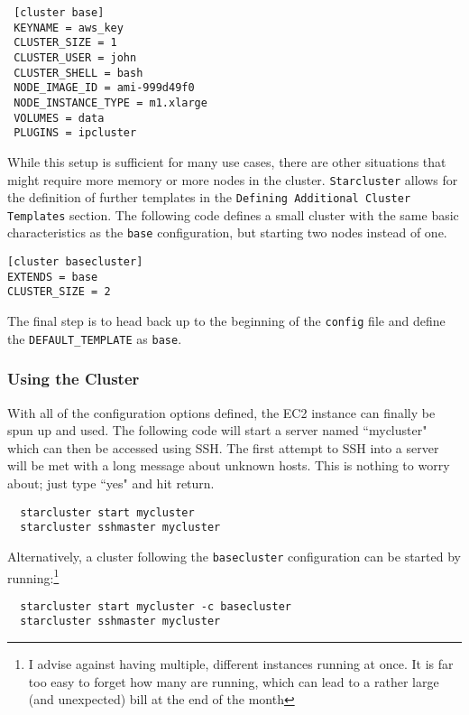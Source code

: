 \documentclass[12pt, letterpaper]{article}
\begin{document}
\begin{verbatim}
 [cluster base]
 KEYNAME = aws_key
 CLUSTER_SIZE = 1
 CLUSTER_USER = john 
 CLUSTER_SHELL = bash
 NODE_IMAGE_ID = ami-999d49f0   
 NODE_INSTANCE_TYPE = m1.xlarge
 VOLUMES = data
 PLUGINS = ipcluster
\end{verbatim}

While this setup is sufficient for many use cases, there are other situations that 
might require more memory or more nodes in the cluster. \texttt{Starcluster} allows for 
the definition of further templates in the \texttt{Defining Additional Cluster Templates}
section. The following code defines a small cluster with the same basic characteristics as the \texttt{base}
configuration, but starting two nodes instead of one. 

\begin{verbatim}
[cluster basecluster]
EXTENDS = base
CLUSTER_SIZE = 2
\end{verbatim}

The final step is to head back up to the beginning of the \texttt{config} file 
and define the \texttt{DEFAULT\_TEMPLATE} as \texttt{base}.

\subsubsection*{Using the Cluster}

With all of the configuration options defined, the EC2 instance can finally be 
spun up and used. The following code will start a server named ``mycluster" which 
can then be accessed using SSH. The first attempt to SSH into a server will be met
with a long message about unknown hosts. This is nothing to worry about; just type
``yes" and hit return. 

\begin{verbatim}
  starcluster start mycluster
  starcluster sshmaster mycluster
\end{verbatim}

\noindent
Alternatively, a cluster following the \texttt{basecluster} configuration can be 
started by running:\footnote{I advise against having multiple, different instances running at once. It is far too easy
to forget how many are running, which can lead to a rather large (and unexpected) bill at the end of the month}

\begin{verbatim}
  starcluster start mycluster -c basecluster
  starcluster sshmaster mycluster
\end{verbatim}
\end{document}
